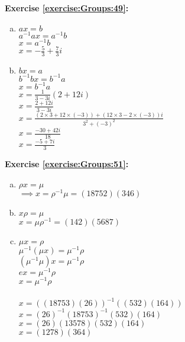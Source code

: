 \noindent\textbf{Exercise \ref{exercise:Groups:49}:}
\begin{enumerate}[(a)]
\item
$ax=b$\\
$a^{-1}ax=a^{-1}b$\\
$x=a^{-1}b$\\
$x = -\frac{5}{3} + \frac{7}{3}i$


\item
$bx = a$\\ 
$b^{-1}bx = b^{-1}a$\\
$x = b^{-1}a$\\
$x = \frac{1}{3 - 3i}(2 + 12i)$\\
$x = \frac{2 + 12i}{3 - 3i}$\\
$x = \frac{(2 \times 3 + 12 \times (-3)) + (12 \times 3 - 2 \times (-3))i}{3^2 + (-3)^2}$\\
$x = \frac{-30 + 42i}{18}$\\
$x = \frac{-5 + 7i}{3}$
\end{enumerate}

\noindent\textbf{Exercise \ref{exercise:Groups:51}:}
\begin{enumerate}[(a)]
\item
$\rho x=\mu$\\
$\implies x=\rho^{-1}\mu=(18752)(346)$\\

\item
$x \rho = \mu$\\
$x=\mu\rho^{-1}=(142)(5687)$

\item
$\mu x = \rho$\\
$\mu^{-1}(\mu x) = \mu^{-1}\rho$\\
$(\mu^{-1}\mu)x = \mu^{-1}\rho$\\
$ex = \mu^{-1}\rho$\\
$x = \mu^{-1}\rho$\\
\\
$x = ((18753)(26))^{-1}((532)(164))$\\
$x = (26)^{-1}(18753)^{-1}(532)(164)$\\
$x = (26)(13578)(532)(164)$\\
$x = (1278)(364)$
\end{enumerate}

